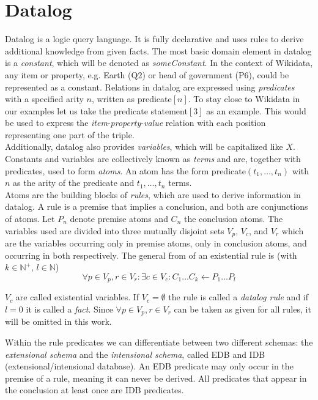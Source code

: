 \documentclass[hyperref,bachelorofscience,fleqn]{cgvpub}
\begin{document}
\section{Datalog}
Datalog is a logic query language. It is fully declarative and uses rules to derive additional knowledge from given facts. The most basic domain element in datalog is a \emph{constant}, which will be denoted as \emph{someConstant}. In the context of Wikidata, any item or property, e.g. Earth (Q2) or head of government (P6), could be represented as a constant. Relations in datalog are expressed using \emph{predicates} with a specified arity \(n\), written as predicate\([n]\). To stay close to Wikidata in our examples let us take the predicate statement\([3]\) as an example. This would be used to express the \emph{item}-\emph{property}-\emph{value} relation with each position representing one part of the triple.\\
Additionally, datalog also provides \emph{variables}, which will be capitalized like \(X\). Constants and variables are collectively known as \emph{terms} and are, together with predicates, used to form \emph{atoms}. An atom has the form predicate\((t_1, \ldots , t_n)\) with \(n\) as the arity of the predicate and \(t_1,\ldots,t_n\) terms.\\
Atoms are the building blocks of \emph{rules}, which are used to derive information in datalog. A rule is a premise that implies a conclusion, and both are conjunctions of atoms. Let \(P_n\) denote  premise atoms and \(C_n\) the conclusion atoms. The variables used are divided into three mutually disjoint sets \(V_p\), \(V_c\), and \(V_r\) which are the variables occurring only in premise atoms, only in conclusion atoms, and occurring in both respectively. The general from of an existential rule is (with \(k \in \mathbb{N}^+\), \(l \in \mathbb{N}\))
\begin{equation*}
\forall p \in V_p, r \in V_r : \exists c \in V_c: C_1 \ldots C_k \leftarrow P_1 \ldots P_l
\end{equation*}

\(V_c\) are called existential variables. If \(V_c = \emptyset\) the rule is called a \emph{datalog rule} and if \(l = 0\) it is called a \emph{fact}. Since \(\forall p \in V_p, r \in V_r\) can be taken as given for all rules, it will be omitted in this work.

Within the rule predicates we can differentiate between two different schemas: the \emph{extensional schema} and the \emph{intensional schema}, called EDB and IDB (extensional/intensional database). An EDB predicate may only occur in the premise of a rule, meaning it can never be derived. All predicates that appear in the conclusion at least once are IDB predicates.
\end{document}
